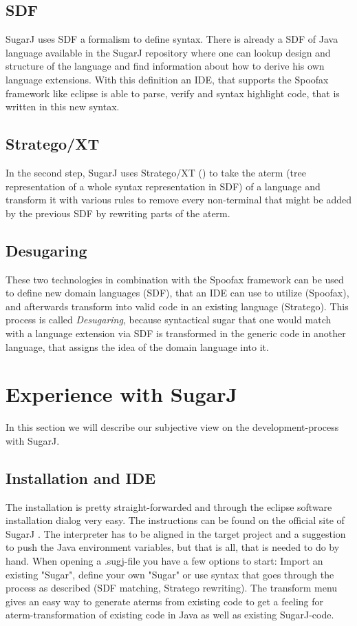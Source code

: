 \documentclass{report}
\begin{document}
\subsection{SDF}
SugarJ uses SDF \cite{Heering-SDF-1989, Brand-SDF-2007} a formalism to define syntax. There is already a SDF of Java language available in the SugarJ repository \cite{Java-SDF-2014} where one can lookup design and structure of the language and find information about how to derive his own language extensions. With this definition an IDE, that supports the Spoofax framework like eclipse is able to parse, verify and syntax highlight code, that is written in this new syntax.

\subsection{Stratego/XT}
In the second step, SugarJ uses Stratego/XT (\cite{Stratego-Manual, Kats-Spoofax-2010}) to take the aterm (tree representation of a whole syntax representation in SDF) of a language and transform it with various rules to remove every non-terminal that might be added by the previous SDF by rewriting parts of the aterm.

\subsection{Desugaring}
These two technologies in combination with the Spoofax framework can be used to define new domain languages (SDF), that an IDE can use to utilize (Spoofax), and afterwards transform into valid code in an existing language (Stratego). This process is called \emph{Desugaring}, because syntactical sugar that one would match with a language extension via SDF is transformed in the generic code in another language, that assigns the idea of the domain language into it.

\section{Experience with SugarJ}
In this section we will describe our subjective view on the development-process with SugarJ.

\subsection{Installation and IDE}
The installation is pretty straight-forwarded and through the eclipse software installation dialog very easy. The instructions can be found on the official site of SugarJ \cite{SugarJ-Homepage}. The interpreter has to be aligned in the target project and a suggestion to push the Java environment variables, but that is all, that is needed to do by hand. When opening a .sugj-file you have a few options to start: Import an existing "Sugar", define your own "Sugar" or use syntax that goes through the process as described (SDF matching, Stratego rewriting). The transform menu gives an easy way to generate aterms from existing code to get a feeling for aterm-transformation of existing code in Java as well as existing SugarJ-code.
\end{document}

